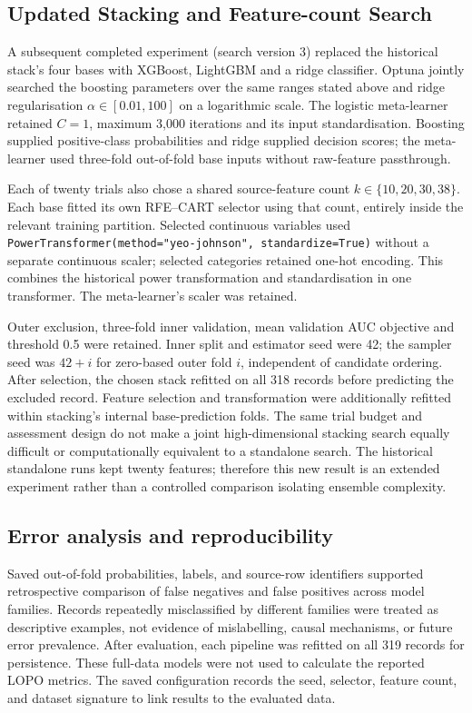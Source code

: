 \subsection{Updated Stacking and Feature-count Search}
A subsequent completed experiment (search version 3) replaced the historical stack's four bases with XGBoost, LightGBM and a ridge classifier. Optuna jointly searched the boosting parameters over the same ranges stated above and ridge regularisation $\alpha\in[0.01,100]$ on a logarithmic scale. The logistic meta-learner retained $C=1$, maximum 3,000 iterations and its input standardisation. Boosting supplied positive-class probabilities and ridge supplied decision scores; the meta-learner used three-fold out-of-fold base inputs without raw-feature passthrough.

Each of twenty trials also chose a shared source-feature count $k\in\{10,20,30,38\}$. Each base fitted its own RFE--CART selector using that count, entirely inside the relevant training partition. Selected continuous variables used \texttt{PowerTransformer(method="yeo-johnson", standardize=True)} without a separate continuous scaler; selected categories retained one-hot encoding. This combines the historical power transformation and standardisation in one transformer. The meta-learner's scaler was retained.

Outer exclusion, three-fold inner validation, mean validation AUC objective and threshold 0.5 were retained. Inner split and estimator seed were 42; the sampler seed was $42+i$ for zero-based outer fold $i$, independent of candidate ordering. After selection, the chosen stack refitted on all 318 records before predicting the excluded record. Feature selection and transformation were additionally refitted within stacking's internal base-prediction folds. The same trial budget and assessment design do not make a joint high-dimensional stacking search equally difficult or computationally equivalent to a standalone search. The historical standalone runs kept twenty features; therefore this new result is an extended experiment rather than a controlled comparison isolating ensemble complexity.

\subsection{Error analysis and reproducibility}
Saved out-of-fold probabilities, labels, and source-row identifiers supported retrospective comparison of false negatives and false positives across model families. Records repeatedly misclassified by different families were treated as descriptive examples, not evidence of mislabelling, causal mechanisms, or future error prevalence. After evaluation, each pipeline was refitted on all 319 records for persistence. These full-data models were not used to calculate the reported LOPO metrics. The saved configuration records the seed, selector, feature count, and dataset signature to link results to the evaluated data.

